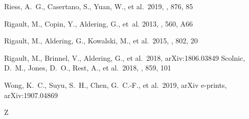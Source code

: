 \documentclass[]{aa} %
\begin{document}
\begin{thebibliography}{}
 Riess, A.~G., Casertano, S., Yuan, W., et al.\ 2019, \apj, 876, 85



Rigault, M., Copin, Y., Aldering, G., {et~al.} 2013, \aap, 560, A66

 Rigault, M., Aldering, G., Kowalski, M., et al.\ 2015, \apj, 802, 20


 Rigault, M.,
  Brinnel, V., Aldering, G., et al.\ 2018, arXiv:1806.03849
 Scolnic, D.~M., Jones, D.~O., Rest, A., et al.\ 2018, \apj, 859, 101

 Wong, K.~C., Suyu, S.~H., Chen, G.~C.-F., et al.\ 2019, arXiv e-prints, arXiv:1907.04869

 Z
\end{thebibliography}
\end{document}

